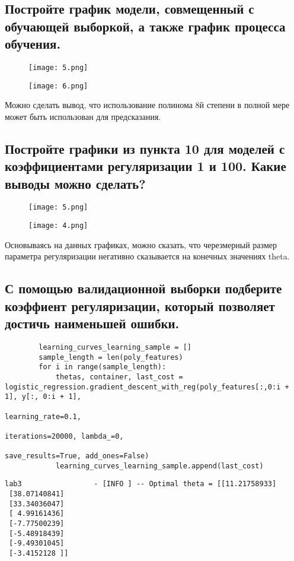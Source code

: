 \subsection{Постройте график модели, совмещенный с обучающей выборкой, а также график процесса обучения.}

\begin{figure}[h]
\centering
	\texttt{[image: 5.png]}
	\label{sec:purpose:payings}
\end{figure}

\begin{figure}[h]
\centering
	\texttt{[image: 6.png]}
	\label{sec:purpose:payings}
\end{figure}

Можно сделать вывод, что использование полинома 8й степени в полной мере может быть использован для предсказания.

\subsection{Постройте графики из пункта 10 для моделей с коэффициентами регуляризации 1 и 100. Какие выводы можно сделать?}

\begin{figure}[h]
\centering
	\texttt{[image: 5.png]}
	\label{sec:purpose:payings}
\end{figure}

\begin{figure}[h]
\centering
	\texttt{[image: 4.png]}
	\label{sec:purpose:payings}
\end{figure}

Основываясь на данных графиках, можно сказать, что черезмерный размер параметра регуляризации негативно сказывается на конечных значениях theta.

\subsection{С помощью валидационной выборки подберите коэффиент регуляризации, который позволяет достичь наименьшей ошибки.}

\begin{lstlisting}
		learning_curves_learning_sample = []
        sample_length = len(poly_features)
        for i in range(sample_length):
            thetas, container, last_cost = logistic_regression.gradient_descent_with_reg(poly_features[:,0:i + 1], y[:, 0:i + 1],
                                                                              learning_rate=0.1,
                                                                              iterations=20000, lambda_=0,
                                                                              save_results=True, add_ones=False)
            learning_curves_learning_sample.append(last_cost)
\end{lstlisting}

\begin{lstlisting}
lab3                 - [INFO ] -- Optimal theta = [[11.21758933]
 [38.07140841]
 [33.34036047]
 [ 4.99161436]
 [-7.77500239]
 [-5.48918439]
 [-9.49301045]
 [-3.4152128 ]]
 \end{lstlisting}




